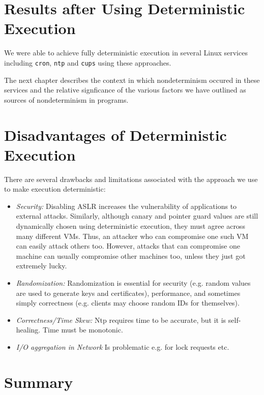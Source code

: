 \section{Results after Using Deterministic Execution} \label{ch3:data}
We were able to achieve fully deterministic execution in several
Linux services including \texttt{cron}, \texttt{ntp} and
\texttt{cups} using these approaches.

The next chapter describes the context in which nondeterminism
occured in these services and the relative signficance of the various factors we have outlined 
as sources of nondeterminism in programs.

\section{Disadvantages of Deterministic Execution} \label{ch3:issues}
There are several drawbacks and limitations associated with the approach we use
to make execution deterministic:
\begin{itemize}
\item {\em Security:} \newline
Disabling ASLR increases the vulnerability of
applications to external attacks. Similarly, although canary and pointer guard
values are still dynamically chosen using deterministic
execution, they must agree across many different VMs. Thus,
an attacker who can compromise one such VM can easily
attack others too. However, attacks
that can compromise one machine can usually compromise
other machines too, unless they just got extremely lucky.
\item {\em Randomization:} \newline
Randomization is essential for security (e.g. random values
are used to generate keys and certificates),
performance, and sometimes simply correctness (e.g. 
clients may choose random IDs for themselves). 
\item{\em Correctness/Time Skew:} \newline
Ntp requires time to be accurate, but it is self-healing.
Time must be monotonic.
\item{\em I/O aggregation in Network} \newline
Is problematic e.g. for lock requests etc.


\end{itemize}

\section {Summary}
